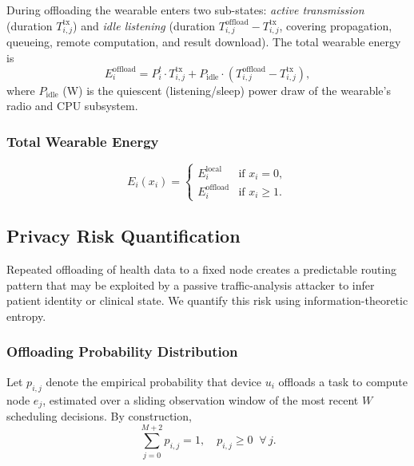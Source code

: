 \documentclass[journal,twoside,letterpaper]{IEEEtran}
\begin{document}
During offloading the wearable enters two sub-states: \emph{active
transmission} (duration $T^{\mathrm{tx}}_{i,j}$) and \emph{idle listening}
(duration $T^{\mathrm{offload}}_{i,j} - T^{\mathrm{tx}}_{i,j}$, covering
propagation, queueing, remote computation, and result download).  The total
wearable energy is
\begin{equation}
  E^{\mathrm{offload}}_i =
    P^t_i \cdot T^{\mathrm{tx}}_{i,j}
    + P_{\mathrm{idle}} \cdot \!\left(T^{\mathrm{offload}}_{i,j}
      - T^{\mathrm{tx}}_{i,j}\right),
  \label{eq:energy_offload}
\end{equation}
where $P_{\mathrm{idle}}$ (W) is the quiescent (listening/sleep) power draw
of the wearable's radio and CPU subsystem.

\subsubsection{Total Wearable Energy}

\begin{equation}
  E_i(x_i) =
  \begin{cases}
    E^{\mathrm{local}}_i   & \text{if } x_i = 0, \\[4pt]
    E^{\mathrm{offload}}_i & \text{if } x_i \geq 1.
  \end{cases}
  \label{eq:energy_total}
\end{equation}

\subsection{Privacy Risk Quantification}
\label{subsec:privacy}

Repeated offloading of health data to a fixed node creates a predictable
routing pattern that may be exploited by a passive traffic-analysis attacker
to infer patient identity or clinical state.  We quantify this risk using
information-theoretic entropy.

\subsubsection{Offloading Probability Distribution}

Let $p_{i,j}$ denote the empirical probability that device $u_i$ offloads a
task to compute node $e_j$, estimated over a sliding observation window of
the most recent $W$ scheduling decisions.  By construction,
\begin{equation}
  \sum_{j=0}^{M+2} p_{i,j} = 1, \quad p_{i,j} \geq 0 \;\; \forall\, j.
  \label{eq:prob_dist}
\end{equation}
\end{document}
